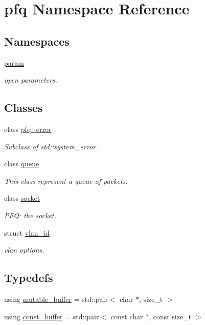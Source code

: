 \hypertarget{namespacepfq}{\section{pfq Namespace Reference}
\label{namespacepfq}
}
\subsection*{Namespaces}
\begin{DoxyCompactItemize}
\item 
 \hyperlink{namespacepfq_1_1param}{param}
\begin{DoxyCompactList}\small\item\em open parameters. \end{DoxyCompactList}\end{DoxyCompactItemize}
\subsection*{Classes}
\begin{DoxyCompactItemize}
\item 
class \hyperlink{classpfq_1_1pfq__error}{pfq\+\_\+error}
\begin{DoxyCompactList}\small\item\em Subclass of std\+::system\+\_\+error. \end{DoxyCompactList}\item 
class \hyperlink{classpfq_1_1queue}{queue}
\begin{DoxyCompactList}\small\item\em This class represent a queue of packets. \end{DoxyCompactList}\item 
class \hyperlink{classpfq_1_1socket}{socket}
\begin{DoxyCompactList}\small\item\em P\+F\+Q\+: the socket. \end{DoxyCompactList}\item 
struct \hyperlink{structpfq_1_1vlan__id}{vlan\+\_\+id}
\begin{DoxyCompactList}\small\item\em vlan options. \end{DoxyCompactList}\end{DoxyCompactItemize}
\subsection*{Typedefs}
\begin{DoxyCompactItemize}
\item 
using \hyperlink{namespacepfq_ad7b88920eaf729154354741132483ea8}{mutable\+\_\+buffer} = std\+::pair$<$ char $\ast$, size\+\_\+t $>$
\item 
using \hyperlink{namespacepfq_ac835a1bd09b4cbaba61c100b50d0a99f}{const\+\_\+buffer} = std\+::pair$<$ const char $\ast$, const size\+\_\+t $>$
\end{DoxyCompactItemize}
